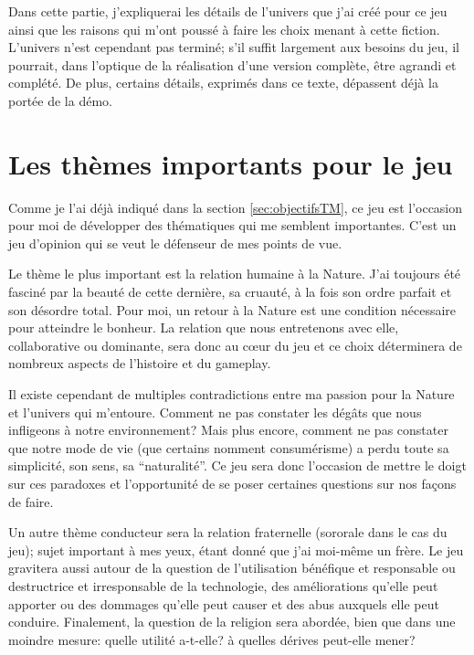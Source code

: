 \printMiniToc



\begin{note}
	Dans cette partie, j'expliquerai les détails de l'univers que j'ai créé pour ce jeu ainsi que les raisons qui m'ont poussé à faire les choix menant à cette fiction. L'univers n'est cependant pas terminé; s'il suffit largement aux besoins du jeu, il pourrait, dans l'optique de la réalisation d'une version complète, être agrandi et complété. De plus, certains détails, exprimés dans ce texte, dépassent déjà la portée de la démo.
\end{note}



\section*{Les thèmes importants pour le jeu}
Comme je l'ai déjà indiqué dans la section \ref{sec:objectifsTM}, ce jeu est l'occasion pour moi de développer des thématiques qui me semblent importantes. C'est un jeu d'opinion qui se veut le défenseur de mes points de vue.

Le thème le plus important est la relation humaine à la Nature. J'ai toujours été fasciné par la beauté de cette dernière, sa cruauté, à la fois son ordre parfait et son désordre total. Pour moi, un retour à la Nature est une condition nécessaire pour atteindre le bonheur. La relation que nous entretenons avec elle, collaborative ou dominante, sera donc au c\oe ur du jeu et ce choix déterminera de nombreux aspects de l'histoire et du gameplay.

Il existe cependant de multiples contradictions entre ma passion pour la Nature et l'univers qui m'entoure. Comment ne pas constater les dégâts que nous infligeons à notre environnement? Mais plus encore, comment ne pas constater que notre mode de vie (que certains nomment consumérisme) a perdu toute sa simplicité, son sens, sa \enquote{naturalité}. Ce jeu sera donc l'occasion de mettre le doigt sur ces paradoxes et l'opportunité de se poser certaines questions sur nos façons de faire.

Un autre thème conducteur sera la relation fraternelle (sororale dans le cas du jeu); sujet important à mes yeux, étant donné que j'ai moi-même un frère. Le jeu gravitera aussi autour de la question de l'utilisation bénéfique et responsable ou destructrice et irresponsable de la technologie, des améliorations qu'elle peut apporter ou des dommages qu'elle peut causer et des abus auxquels elle peut conduire. Finalement, la question de la religion sera abordée, bien que dans une moindre mesure: quelle utilité a-t-elle? à quelles dérives peut-elle mener?


